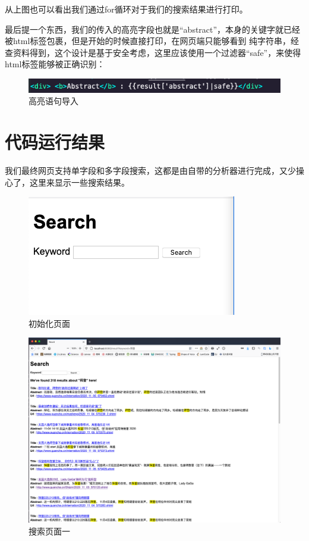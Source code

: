 \documentclass[UTF8]{ctexart}
\begin{document}
            从上图也可以看出我们通过for循环对于我们的搜索结果进行打印。

            最后提一个东西，我们的传入的高亮字段也就是“abstract”，本身的关键字就已经被html标签包裹，但是开始的时候直接打印，在网页端只能够看到
            纯字符串，经查资料得到，这个设计是基于安全考虑，这里应该使用一个过滤器“safe”，来使得html标签能够被正确识别：
            \begin{figure}[ht]
                \centering
                \includegraphics[scale=0.6]{img/hi.png}
                \caption{高亮语句导入}
            \end{figure}
    \section{代码运行结果}
        我们最终网页支持单字段和多字段搜索，这都是由自带的分析器进行完成，又少操心了，这里来显示一些搜索结果。

        \begin{figure}[ht]
            \centering
            \includegraphics[scale=0.4]{img/search.png}
            \caption{初始化页面}
        \end{figure}

        \begin{figure}[ht]
            \centering
            \includegraphics[scale=0.22]{img/result1.png}
            \caption{搜索页面一}
        \end{figure}
\end{document}
